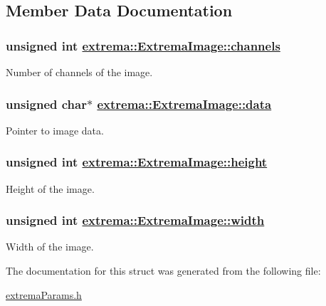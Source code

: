\subsection{Member Data Documentation}
\hypertarget{structextrema_1_1ExtremaImage_c9b071c294514d52fb545196b2148edb}{
\subsubsection[channels]{\setlength{\rightskip}{0pt plus 5cm}unsigned int \hyperlink{structextrema_1_1ExtremaImage_c9b071c294514d52fb545196b2148edb}{extrema::Extrema\-Image::channels}}}
\label{structextrema_1_1ExtremaImage_c9b071c294514d52fb545196b2148edb}


Number of channels of the image. 

\hypertarget{structextrema_1_1ExtremaImage_9d987c2f0a4b445e96a8cdd9ad5a728c}{
\subsubsection[data]{\setlength{\rightskip}{0pt plus 5cm}unsigned char$\ast$ \hyperlink{structextrema_1_1ExtremaImage_9d987c2f0a4b445e96a8cdd9ad5a728c}{extrema::Extrema\-Image::data}}}
\label{structextrema_1_1ExtremaImage_9d987c2f0a4b445e96a8cdd9ad5a728c}


Pointer to image data. 

\hypertarget{structextrema_1_1ExtremaImage_28dcc2053047bc6b721cc3bc7e834ef1}{
\subsubsection[height]{\setlength{\rightskip}{0pt plus 5cm}unsigned int \hyperlink{structextrema_1_1ExtremaImage_28dcc2053047bc6b721cc3bc7e834ef1}{extrema::Extrema\-Image::height}}}
\label{structextrema_1_1ExtremaImage_28dcc2053047bc6b721cc3bc7e834ef1}


Height of the image. 

\hypertarget{structextrema_1_1ExtremaImage_c72e8fa175fb17771c24b0afda2af618}{
\subsubsection[width]{\setlength{\rightskip}{0pt plus 5cm}unsigned int \hyperlink{structextrema_1_1ExtremaImage_c72e8fa175fb17771c24b0afda2af618}{extrema::Extrema\-Image::width}}}
\label{structextrema_1_1ExtremaImage_c72e8fa175fb17771c24b0afda2af618}


Width of the image. 



The documentation for this struct was generated from the following file:\begin{CompactItemize}
\item 
\hyperlink{extremaParams_8h}{extrema\-Params.h}\end{CompactItemize}
